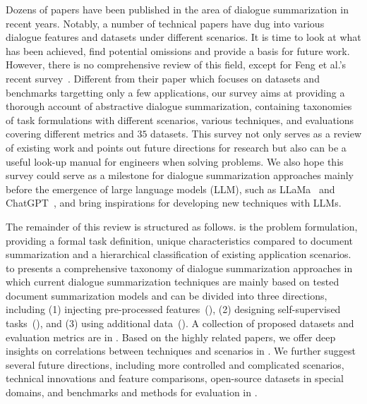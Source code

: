 

Dozens of papers have been published in the area of dialogue summarization in recent years. 
Notably, a number of technical papers have dug into various dialogue features and datasets under different scenarios. 
It is time to look at what has been achieved, find potential omissions and provide a basis for future work.
However, there is no comprehensive review of this field, except for Feng et al.'s recent survey~\cite{feng2021survey}. 
Different from their paper which focuses on datasets and benchmarks targetting only a few applications, 
our survey aims at providing a thorough account of abstractive dialogue summarization, containing taxonomies of task formulations with different scenarios, various techniques, and evaluations covering different metrics and $35$ datasets.
This survey not only serves as a review of existing work and points out future directions for research but also can be a useful look-up manual 
for engineers when solving problems. We also hope this survey could serve as a milestone for dialogue summarization approaches mainly before the emergence of large language models (LLM), such as LLaMa~\cite{touvron2023llama} and ChatGPT~\cite{openai2022}, and bring inspirations for developing new techniques with LLMs.


The remainder of this review is structured as follows.  is the problem formulation, providing a formal task definition, 
unique characteristics compared to document summarization and a hierarchical classification of existing application scenarios.
 to  presents a comprehensive taxonomy of dialogue summarization approaches in which current dialogue 
summarization techniques are mainly based on tested document summarization models and can be divided into 
three directions, including (1) injecting pre-processed features~(), (2) designing self-supervised tasks~(), and 
(3) using additional data~().
A collection of proposed datasets and evaluation metrics are in .
Based on the highly related papers, 
we offer deep insights on correlations between techniques and scenarios in . 
We further suggest several future directions, including more controlled and complicated 
scenarios, technical innovations and feature comparisons, open-source datasets in special domains, 
and benchmarks and methods for evaluation in .


